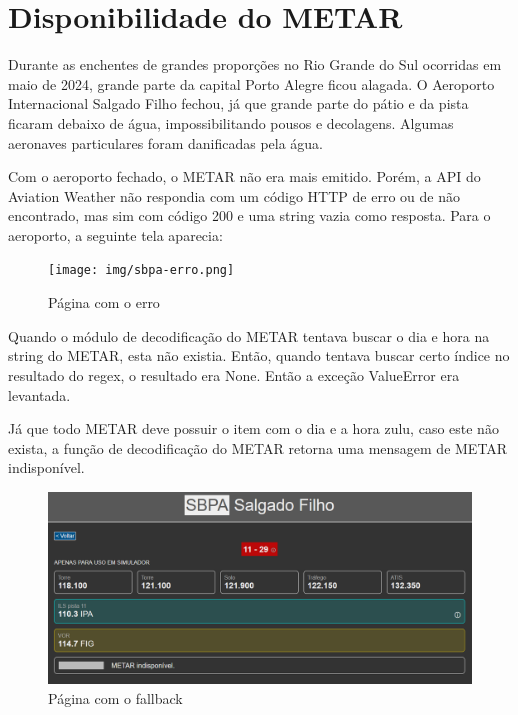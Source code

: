 \section{Disponibilidade do METAR}

Durante as enchentes de grandes proporções no Rio Grande do Sul ocorridas em maio de 2024, grande
parte da capital Porto Alegre ficou alagada. O Aeroporto Internacional Salgado Filho fechou, já
que grande parte do pátio e da pista ficaram debaixo de água, impossibilitando pousos e decolagens.
Algumas aeronaves particulares foram danificadas pela água.

Com o aeroporto fechado, o METAR não era mais emitido. Porém, a API do Aviation Weather não
respondia com um código HTTP de erro ou de não encontrado, mas sim com código 200 e uma string
vazia como resposta. Para o aeroporto, a seguinte tela aparecia:

\begin{figure}[ht]
    \begin{center}
    \texttt{[image: img/sbpa-erro.png]}
    \caption{Página com o erro}
    \label{fig:sbpa-erro}
    \end{center}
\end{figure}

Quando o módulo de decodificação do METAR tentava buscar o dia e hora na string do METAR, esta
não existia. Então, quando tentava buscar certo índice no resultado do regex, o resultado era None.
Então a exceção ValueError era levantada.

Já que todo METAR deve possuir o item com o dia e a hora zulu, caso este não exista, a função de
decodificação do METAR retorna uma mensagem de METAR indisponível.

\begin{figure}[ht]
    \begin{center}
    \includegraphics[width=400pt]{img/sbpa.png}
    \caption{Página com o fallback}
    \label{fig:sbpa}
    \end{center}
\end{figure}

